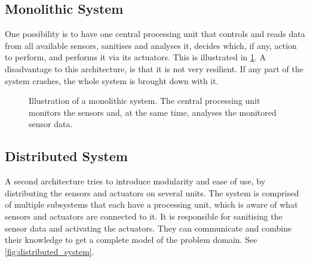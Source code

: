 \subsection{Monolithic System}
One possibility is to have one central processing unit that controls and reads data from all available sensors, sanitises and analyses it, decides which, if any, action to perform, and performs it via its actuators. This is illustrated in \cref{fig:monolithic_system}. A disadvantage to this architecture, is that it is not very resilient. If any part of the system crashes, the whole system is brought down with it.

\begin{figure}[htbp]
\centering
{}
\caption[Monolithic system]{Illustration of a monolithic system. The central processing unit monitors the sensors and, at the same time, analyses the monitored sensor data.}\label{fig:monolithic_system}
\end{figure}


\subsection{Distributed System}
A second architecture tries to introduce modularity and ease of use, by distributing the sensors and actuators on several units. The system is comprised of multiple subsystems that each have a processing unit, which is aware of what sensors and actuators are connected to it. It is responsible for sanitising the sensor data and activating the actuators. They can communicate and combine their knowledge to get a complete model of the problem domain. See \cref{fig:distributed_system}.

